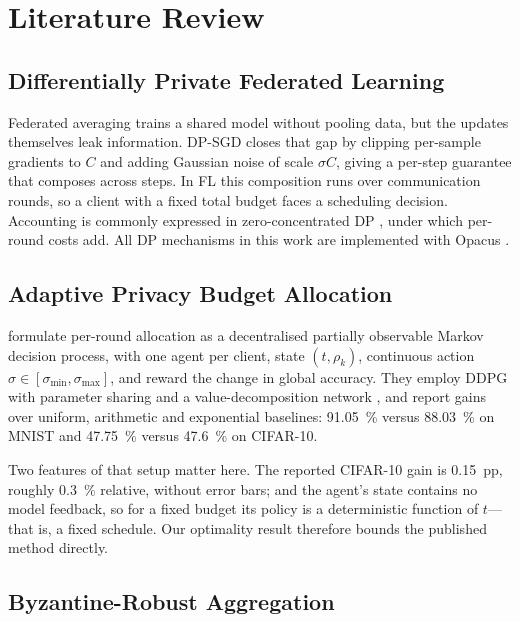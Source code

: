 \chapter{Literature Review}

\section{Differentially Private Federated Learning}

Federated averaging \citep{mcmahan2017communication} trains a shared model
without pooling data, but the updates themselves leak information. DP-SGD
\citep{abadi2016deep} closes that gap by clipping per-sample gradients to $C$ and
adding Gaussian noise of scale $\sigma C$, giving a per-step guarantee that
composes across steps. In FL this composition runs over communication rounds, so
a client with a fixed total budget faces a scheduling decision. Accounting is
commonly expressed in zero-concentrated DP \citep{bun2016concentrated}, under
which per-round costs add. All DP mechanisms in this work are implemented with
Opacus \citep{opacus2021}.

\section{Adaptive Privacy Budget Allocation}

\citet{chen2024adaptive} formulate per-round allocation as a decentralised
partially observable Markov decision process, with one agent per client, state
$(t,\rho_k)$, continuous action $\sigma\in[\sigma_{\min},\sigma_{\max}]$, and
reward the change in global accuracy. They employ DDPG \citep{lillicrap2016continuous} with parameter sharing
and a value-decomposition network \citep{sunehag2018value}, and report gains over uniform, arithmetic and
exponential baselines: \SI{91.05}{\percent} versus \SI{88.03}{\percent} on MNIST
and \SI{47.75}{\percent} versus \SI{47.6}{\percent} on CIFAR-10.

Two features of that setup matter here. The reported CIFAR-10 gain is
\SI{0.15}{pp}, roughly \SI{0.3}{\percent} relative, without error bars; and the
agent's state contains no model feedback, so for a fixed budget its policy is a
deterministic function of $t$---that is, a fixed schedule. Our optimality result
therefore bounds the published method directly.

\section{Byzantine-Robust Aggregation}

